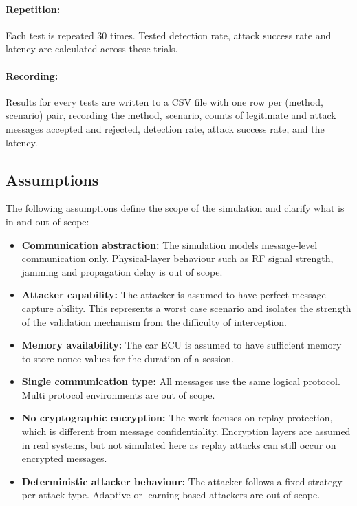 \documentclass[a4paper,man,12pt]{article}
\begin{document}
\paragraph{Repetition:}
Each test is repeated 30 times. Tested detection rate, attack success rate and latency are calculated across these trials.

\paragraph{Recording:}
Results for every tests are written to a CSV file with one row per (method, scenario) pair, recording the method, scenario, counts of legitimate and attack messages accepted and rejected, detection rate, attack success rate, and the latency.


\subsection{Assumptions}

The following assumptions define the scope of the simulation and clarify what 
is in and out of scope:

\begin{itemize}
    \item \textbf{Communication abstraction:} The simulation models 
    message-level communication only. Physical-layer behaviour such as RF 
    signal strength, jamming and propagation delay is out of scope.
    \item \textbf{Attacker capability:} The attacker is assumed to have 
    perfect message capture ability. This represents a worst case scenario and 
    isolates the strength of the validation mechanism from the difficulty of 
    interception.
    \item \textbf{Memory availability:} The car ECU is assumed to have 
    sufficient memory to store nonce values for the duration of a session. 
    \item \textbf{Single communication type:} All messages use the same logical 
    protocol. Multi protocol environments are out of scope.
    \item \textbf{No cryptographic encryption:} The work focuses on replay protection, which is different from message confidentiality. Encryption layers are assumed in real systems, but not simulated here as replay attacks can still occur on encrypted messages.
    \item \textbf{Deterministic attacker behaviour:} The attacker follows a 
    fixed strategy per attack type. Adaptive or learning based attackers are 
    out of scope.
\end{itemize}
\end{document}
